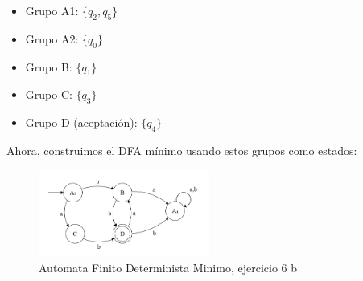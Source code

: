 \begin{enumerate}
\begin{itemize}
        \item Grupo A1: $\{q_2, q_5\}$
        \item Grupo A2: $\{q_0\}$
        \item Grupo B: $\{q_1\}$
        \item Grupo C: $\{q_3\}$
        \item Grupo D (aceptación): $\{q_4\}$   
    \end{itemize}
    Ahora, construimos el DFA mínimo usando estos grupos como estados:
    \begin{figure}[ht]
        \centering
        \includegraphics[width=0.5\textwidth]{images/6bresuelto.png}
        \caption{Automata Finito Determinista Minimo, ejercicio 6 b}
    \end{figure}
\end{enumerate}